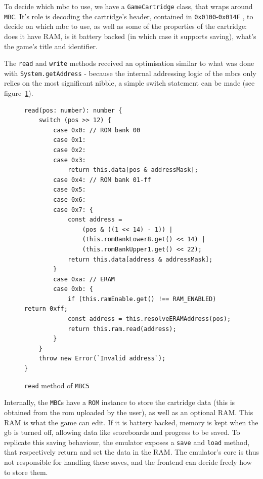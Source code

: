 \documentclass[11pt]{informatics-report}
\begin{document}
To decide which \gls{mbc} to use, we have a \texttt{GameCartridge} class, that wraps around \texttt{MBC}. It's role is decoding the cartridge's header, contained in \texttt{0x0100}-\texttt{0x014F} \cite[The Cartridge Header]{pandoc}, to decide on which \gls{mbc} to use, as well as some of the properties of the cartridge: does it have RAM, is it battery backed (in which case it supports saving), what's the game's title and identifier.

The \texttt{read} and \texttt{write} methods received an optimisation similar to what was done with \texttt{System.getAddress} - because the internal addressing logic of the \glspl{mbc} only relies on the most significant nibble, a simple switch statement can be made (see figure~\ref{fig:mbc-read-switch}).

\begin{figure}[h]
    \begin{verbatim}
read(pos: number): number {
    switch (pos >> 12) {
        case 0x0: // ROM bank 00
        case 0x1:
        case 0x2:
        case 0x3:
        	return this.data[pos & addressMask];
        case 0x4: // ROM bank 01-ff
        case 0x5:
        case 0x6:
        case 0x7: {
            const address =
                (pos & ((1 << 14) - 1)) |
                (this.romBankLower8.get() << 14) |
                (this.romBankUpper1.get() << 22);
            return this.data[address & addressMask];
        }
        case 0xa: // ERAM
        case 0xb: {
            if (this.ramEnable.get() !== RAM_ENABLED) return 0xff;
            const address = this.resolveERAMAddress(pos);
            return this.ram.read(address);
        }
    }
    throw new Error(`Invalid address`);
}
    \end{verbatim}
    \caption{\texttt{read} method of \texttt{MBC5} \cite[MBC5]{pandoc}}
    \label{fig:mbc-read-switch}
\end{figure}

Internally, the \texttt{MBC}s have a \texttt{ROM} instance to store the cartridge data (this is obtained from the \gls{rom} uploaded by the user), as well as an optional RAM. This RAM is what the game can edit. If it is battery backed, memory is kept when the \gls{gb} is turned off, allowing data like scoreboards and progress to be saved. To replicate this saving behaviour, the emulator exposes a \texttt{save} and \texttt{load} method, that respectively return and set the data in the RAM. The emulator's core is thus not responsible for handling these saves, and the frontend can decide freely how to store them.
\end{document}
